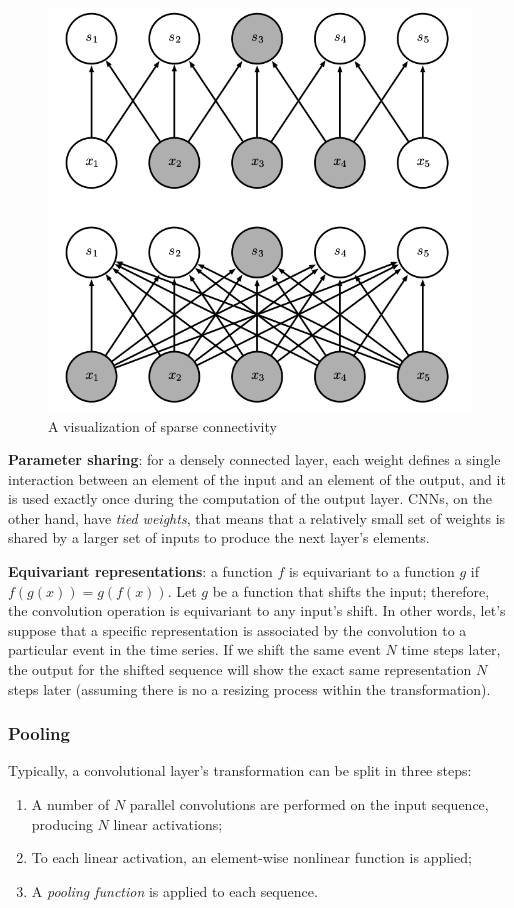 \documentclass[a4paper, twoside]{article}
\begin{document}
        \begin{figure}[H]
            \centering
            \includegraphics[width=0.6\linewidth]{sparse_connectivity.png}
            \caption{A visualization of sparse connectivity}
        \end{figure}



        \textbf{Parameter sharing}: for a densely connected layer, each weight defines a single interaction between an element of the input and an element of the output, and it is used exactly once during the computation of the output layer. CNNs, on the other hand, have \textit{tied weights}, that means that a relatively small set of weights is shared by a larger set of inputs to produce the next layer's elements.

        \textbf{Equivariant representations}: a function $f$ is equivariant to a function $g$ if $f(g(x)) = g(f(x))$. Let $g$ be a function that shifts the input; therefore, the convolution operation is equivariant to any input's shift. In other words, let's suppose that a specific representation is associated by the convolution to a particular event in the time series. If we shift the same event $N$ time steps later, the output for the shifted sequence will show the exact same representation $N$ steps later (assuming there is no a resizing process within the transformation).


        \subsubsection{Pooling}

        Typically, a convolutional layer's transformation can be split in three steps:
        \begin{enumerate}
            \item A number of $N$ parallel convolutions are performed on the input sequence, producing $N$ linear activations;
            \item To each linear activation, an element-wise nonlinear function is applied;
            \item A \textit{pooling function} is applied to each sequence.
        \end{enumerate}
\end{document}
